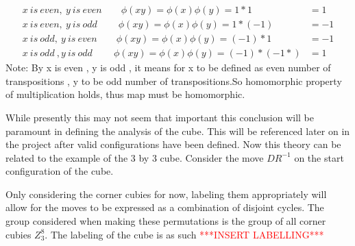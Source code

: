 \documentclass{article}
\begin{document}
\begin{align}
x\ is\ even,\ y\ is\ even\qquad	\phi(xy) = \phi(x)\phi(y) = 1*1 &= 1\\
x\ is\ even,\ y\ is\ odd\ \qquad	\phi(xy) = \phi(x)\phi(y) = 1*(-1) &= -1\\
x\ is\ odd,\ y\ is\ even\qquad	\phi(xy) = \phi(x)\phi(y) = (-1)*1 &= -1\\
x\ is\ odd\ ,y\ is\ odd \ \qquad	\phi(xy) = \phi(x)\phi(y) = (-1)*(-1*) &= 1
\end{align}
Note: By x is even , y is odd , it means for x to be defined as even number of transpositions , y to be odd number of transpositions.So homomorphic property of multiplication holds, thus map must be homomorphic.



While presently this may not seem that important this conclusion will be paramount in defining the analysis of the cube. This will be referenced later on in the project after valid configurations have been defined.
Now this theory can be related to the example of the 3 by 3 cube. Consider the move $DR^{-1}$ on the start configuration of the cube.


\begin{figure}[hbt]
\centering%
  \RubikCubeSolved%
    \hspace{.4cm}
    \quad{}%
    \hspace{.4cm}
  	\hspace{.4cm}
    \quad{}%
    \hspace{.4cm}
\end{figure}
Only considering the corner cubies for now, labeling them appropriately will allow for the moves to be expressed as a combination of disjoint cycles. The group considered when making these permutations is the group of all corner cubies $Z_{3}^{8}$. The labeling of the cube is as such \textcolor{red}{***INSERT LABELLING***}
\end{document}
